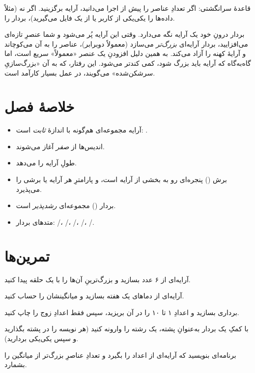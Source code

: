 \begin{tip}
قاعدهٔ سرانگشتی: اگر تعدادِ عناصر را پیش از اجرا می‌دانید، آرایه برگزینید. اگر
نه (مثلاً داده‌ها را یکی‌یکی از کاربر یا از یک فایل می‌گیرید)، بردار را.
\end{tip}

\begin{deep}
بردار درونِ خود یک آرایه نگه می‌دارد. وقتی این آرایه پُر می‌شود و شما عنصرِ
تازه‌ای می‌افزایید، بردار آرایه‌ای \emph{بزرگ‌تر} می‌سازد (معمولاً دوبرابر)،
عناصر را به آن می‌کوچاند و آرایهٔ کهنه را آزاد می‌کند. به همین دلیل افزودنِ یک
عنصر «معمولاً» سریع است، اما گاه‌به‌گاه که آرایه باید بزرگ شود، کمی کندتر
می‌شود. این رفتار، که به آن «بزرگ‌سازیِ سرشکن‌شده» می‌گویند، در عمل بسیار
کارآمد است.
\end{deep}

\section{خلاصهٔ فصل}

\begin{itemize}
  \item آرایه مجموعه‌ای هم‌گونه با اندازهٔ \emph{ثابت} است: .
  \item اندیس‌ها از \emph{صفر} آغاز می‌شوند.
  \item {} طولِ آرایه را می‌دهد.
  \item برش () پنجره‌ای رو به بخشی از آرایه است، و پارامترِ
         هر آرایه یا برشی را می‌پذیرد.
  \item بردار () مجموعه‌ای \emph{رشدپذیر} است.
  \item متدهای بردار: /، /،
        /، /،
        /.
\end{itemize}

\section{تمرین‌ها}

\exercise آرایه‌ای از ۶ عدد بسازید و بزرگ‌ترینِ آن‌ها را با یک حلقه پیدا کنید.

\exercise آرایه‌ای از دماهای یک هفته بسازید و میانگینشان را حساب کنید.

\exercise برداری بسازید و اعدادِ ۱ تا ۱۰ را در آن بریزید، سپس فقط اعدادِ زوج را
چاپ کنید.

\exercise با کمکِ یک بردار به‌عنوانِ پشته، یک رشته را وارونه کنید (هر نویسه را
در پشته بگذارید و سپس یکی‌یکی بردارید).

\exercise برنامه‌ای بنویسید که آرایه‌ای از اعداد را بگیرد و تعدادِ عناصرِ بزرگ‌تر
از میانگین را بشمارد.

